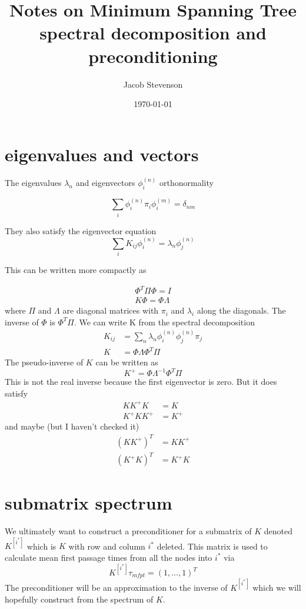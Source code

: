 \documentclass[a4paper]{article}
\title{Notes on Minimum Spanning Tree spectral decomposition and preconditioning}
\author{Jacob Stevenson}
\date{\today}
\newcommand{\evec}[2]{\phi^{(#2)}_{#1}}
\newcommand{\subK}{K^{[i^{*}]}}
\begin{document}
\maketitle

\section{eigenvalues and vectors}

The eigenvalues $\lambda_n$ and eigenvectors $\phi^{(n)}_i$ orthonormality

\begin{equation}
\sum_i \phi^{(n)}_i \pi_i \phi^{(m)}_i = \delta_{nm}
\end{equation}

They also satisfy the eigenvector equation
\begin{equation}
\sum_i K_{ij} \evec{i}{n}  = \lambda_n \evec{j}{n}
\end{equation}

This can be written more compactly as

\begin{align}
\Phi^{T} \Pi \Phi = I \\
K \Phi = \Phi \Lambda
\end{align}
where $\Pi$ and $\Lambda$ are diagonal matrices with $\pi_i$ and $\lambda_i$ along the diagonals.
The inverse of $\Phi$ is $\Phi^{T} \Pi$.
We can write K from the spectral decomposition
\begin{align}
K_{ij} &= \sum_n \lambda_n \evec{i}{n} \evec{j}{n} \pi_j \\
K &= \Phi \Lambda \Phi^T \Pi
\end{align}
The pseudo-inverse of $K$ can be written as
\begin{equation}
K^{+} = \Phi \Lambda^{-1} \Phi^T \Pi
\end{equation}
This is not the real inverse because the first eigenvector is zero.  But it does satisfy 
\begin{align}
K K^{+} K &= K \\
K^{+} K K^{+} &= K^{+}
\end{align}
and maybe (but I haven't checked it)
\begin{align}
(K K^{+})^T &= K K^{+} \\
(K^{+} K)^T &= K^{+} K
\end{align}

\section{submatrix spectrum}
We ultimately want to construct a preconditioner for a submatrix of $K$ denoted $\subK{}$ which is $K$
with row and column $i^{*}$ deleted.  This matrix is used to calculate mean first passage times from all the nodes
into $i^{*}$ via
\begin{equation}
\subK{} \tau_{mfpt} = (1, \dots, 1)^T
\end{equation}
The preconditioner will be an approximation to the inverse of $\subK{}$ which we will hopefully construct from 
the spectrum of $K$.
\end{document}
